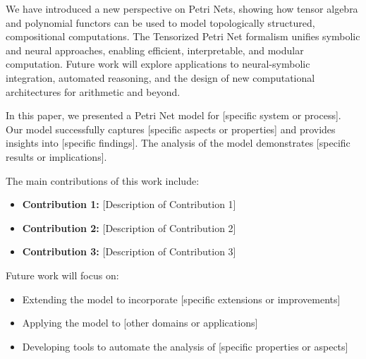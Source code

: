 \label{sec:conclusion}

We have introduced a new perspective on Petri Nets, showing how tensor algebra and polynomial functors can be used to model topologically structured, compositional computations. The Tensorized Petri Net formalism unifies symbolic and neural approaches, enabling efficient, interpretable, and modular computation. Future work will explore applications to neural-symbolic integration, automated reasoning, and the design of new computational architectures for arithmetic and beyond.

In this paper, we presented a Petri Net model for [specific system or process]. Our model successfully captures [specific aspects or properties] and provides insights into [specific findings]. The analysis of the model demonstrates [specific results or implications].

The main contributions of this work include:
\begin{itemize}[leftmargin=*]
    \item \textbf{Contribution 1:} [Description of Contribution 1]
    \item \textbf{Contribution 2:} [Description of Contribution 2]
    \item \textbf{Contribution 3:} [Description of Contribution 3]
\end{itemize}

Future work will focus on:
\begin{itemize}
    \item Extending the model to incorporate [specific extensions or improvements]
    \item Applying the model to [other domains or applications]
    \item Developing tools to automate the analysis of [specific properties or aspects]
\end{itemize}